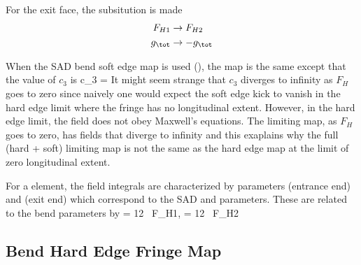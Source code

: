 For the exit face, the subsitution is made
\begin{align}
  F_{H1} &\rightarrow F_{H2} \CRNO
  g_\tot &\rightarrow -g_\tot
\end{align}

When the SAD bend soft edge map is used (), the map is
the same except that the value of $c_3$ is
\Begineq
  c_3 = 
\Endeq
It might seem strange that $c_3$ diverges to infinity as $F_H$ goes to
zero since naively one would expect the soft edge kick to vanish in
the hard edge limit where the fringe has no longitudinal
extent. However, in the hard edge limit, the field does not obey
Maxwell's equations. The limiting map, as $F_H$ goes to zero, has
fields that diverge to infinity and this exaplains why the full (hard
+ soft) limiting map is not the same as the hard edge map at the limit
of zero longitudinal extent.

For a  element, the field integrals are characterized by
parameters  (entrance end) and  (exit end) which
correspond to the SAD  and  parameters. These are related
to the bend parameters by
\Begineq
   = 12 \, F_{H1}, \qquad {} = 12 \, F_{H2}
\Endeq

\subsection{Bend Hard Edge Fringe Map}
\label{s:fringe.bend.hard}

